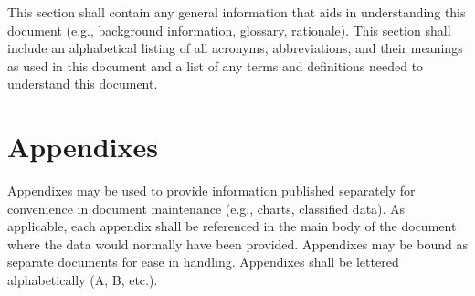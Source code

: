 This section shall contain any general information that aids in
understanding this document (e.g., background information, glossary,
rationale). This section shall include an alphabetical listing of all
acronyms, abbreviations, and their meanings as used in this document and
a list of any terms and definitions needed to understand this document.

\appendix

\section{Appendixes}

Appendixes may be used to provide information published separately for
convenience in document maintenance (e.g., charts, classified data). As
applicable, each appendix shall be referenced in the main body of the
document where the data would normally have been provided. Appendixes
may be bound as separate documents for ease in handling. Appendixes
shall be lettered alphabetically (A, B, etc.).
